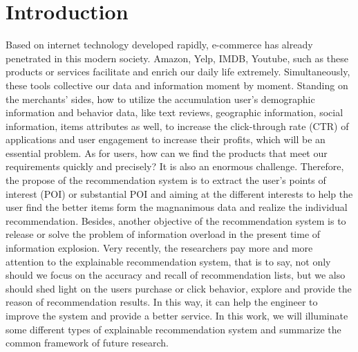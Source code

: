 \documentclass[10pt,twocolumn,letterpaper]{article}
\begin{document}
\section{Introduction}
Based on internet technology developed rapidly, e-commerce has already penetrated in this modern society. Amazon, Yelp, IMDB, Youtube, such as these products or services facilitate and enrich our daily life extremely. Simultaneously, these tools collective our data and information moment by moment. Standing on the merchants' sides, how to utilize the accumulation user's demographic information and behavior data, like text reviews, geographic information, social information, items attributes as well, to increase the click-through rate (CTR) of applications and user engagement to increase their profits, which will be an essential problem. As for users, how can we find the products that meet our requirements quickly and precisely? It is also an enormous challenge. Therefore, the propose of the recommendation system is to extract the user's points of interest (POI) or substantial POI and aiming at the different interests to help the user find the better items form the magnanimous data and realize the individual recommendation. Besides, another objective of the recommendation system is to release or solve the problem of information overload in the present time of information explosion. Very recently, the researchers pay more and more attention to the explainable recommendation system, that is to say, not only should we focus on the accuracy and recall of recommendation lists, but we also should shed light on the users purchase or click behavior, explore and provide the reason of recommendation results. In this way, it can help the engineer to improve the system and provide a better service. In this work, we will illuminate some different types of explainable recommendation system and summarize the common framework of future research.

\end{document}
